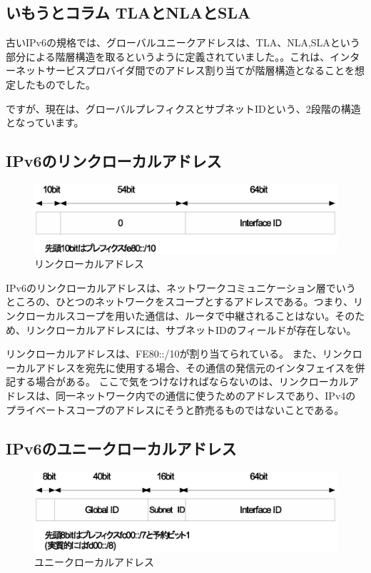 \subsection*{いもうとコラム TLAとNLAとSLA}
古いIPv6の規格では、グローバルユニークアドレスは、TLA、NLA,SLAという部分による階層構造を取るというように定義されていました。。これは、インターネットサービスプロバイダ間でのアドレス割り当てが階層構造となることを想定したものでした。

ですが、現在は、グローバルプレフィクスとサブネットIDという、2段階の構造となっています。


\subsection{IPv6のリンクローカルアドレス}

\begin{figure}[htbp]
	\includegraphics[width=12cm,clip]{draw/lla.eps}
	\caption{リンクローカルアドレス}
	\label{fig:lla}
\end{figure}

IPv6のリンクローカルアドレスは、ネットワークコミュニケーション層でいうところの、ひとつのネットワークをスコープとするアドレスである。つまり、リンクローカルスコープを用いた通信は、ルータで中継されることはない。そのため、リンクローカルアドレスには、サブネットIDのフィールドが存在しない。

リンクローカルアドレスは、FE80::/10が割り当てられている。
また、リンクローカルアドレスを宛先に使用する場合、その通信の発信元のインタフェイスを併記する場合がある。
ここで気をつけなければならないのは、リンクローカルアドレスは、同一ネットワーク内での通信に使うためのアドレスであり、IPv4のプライベートスコープのアドレスにそうと酢売るものではないことである。


\subsection{IPv6のユニークローカルアドレス}

\begin{figure}[htbp]
	\includegraphics[width=12cm,clip]{draw/ula.eps}
	\caption{ユニークローカルアドレス}
	\label{fig:ula}
\end{figure}

